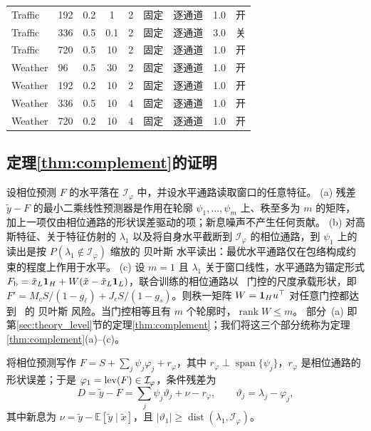 {\begin{table}[t]
\begin{tabular}{llccclccc}
Traffic & 192 & 0.2 & 1 & 2 & 固定 & 逐通道 & 1.0 & 开 \\
Traffic & 336 & 0.5 & 0.1 & 2 & 固定 & 逐通道 & 3.0 & 关 \\
Traffic & 720 & 0.5 & 10 & 2 & 固定 & 逐通道 & 1.0 & 开 \\
Weather & 96 & 0.5 & 30 & 2 & 固定 & 逐通道 & 1.0 & 开 \\
Weather & 192 & 0.2 & 10 & 2 & 固定 & 逐通道 & 1.0 & 开 \\
Weather & 336 & 0.5 & 10 & 4 & 固定 & 逐通道 & 1.0 & 开 \\
Weather & 720 & 0.2 & 10 & 4 & 固定 & 逐通道 & 1.0 & 开 \\
\bottomrule
\end{tabular}
\end{table}

\subsection{定理\ref{thm:complement}的证明}
\label{app:proof_complement}

 设相位预测 $F$ 的水平落在 $\mathcal I_\varphi$ 中，并设水平通路读取窗口的任意特征。
(a) 残差 $\tilde y-F$ 的最小二乘线性预测器是作用在轮廓 $\psi_1,\dots,\psi_m$ 上、秩至多为 $m$ 的矩阵，加上一项仅由相位通路的形状误差驱动的项；新息噪声不产生任何贡献。
(b) 对高斯特征、关于特征仿射的 $\lambda_1$ 以及将自身水平截断到 $\mathcal I_\varphi$ 的相位通路，到 $\psi_1$ 上的读出是按 $P(\lambda_1\notin\mathcal I_\varphi)$ 缩放的 贝叶斯 水平读出：最优水平通路仅在包络构成约束的程度上作用于水平。
(c) 设 $m=1$ 且 $\lambda_1$ 关于窗口线性，水平通路为锚定形式 $F_{\mathrm b}=\tilde x_L\mathbf 1_H+W(\tilde x-\tilde x_L\mathbf 1_L)$，联合训练的相位通路以~ 门控的尺度承载形状，即 $F'=M_cS/(1-g_\ell)+J_cS/(1-g_s)$。则秩一矩阵 $W=\mathbf 1_Hu^\top$ 对任意门控都达到~ 的 贝叶斯 风险。当门控相等且有 $m$ 个轮廓时，$\operatorname{rank}W\le m$。
部分~(a) 即第\ref{sec:theory_level}节的定理\ref{thm:complement}；我们将这三个部分统称为定理\ref{thm:complement}(a)--(c)。

将相位预测写作 $F=S+\sum_j\psi_j\varphi_j+r_\varphi$，其中 $r_\varphi\perp\operatorname{span}\{\psi_j\}$，$r_\varphi$ 是相位通路的形状误差；于是 $\varphi_1=\operatorname{lev}(F)\in\mathcal I_\varphi$，条件残差为
\begin{equation}
D=\tilde y-F=\textstyle\sum_j\psi_j\vartheta_j+\nu-r_\varphi,\qquad\vartheta_j=\lambda_j-\varphi_j,
\label{eq:dcond}
\end{equation}
其中新息为 $\nu=\tilde y-\mathbb E[\tilde y\mid\tilde x]$，且 $|\vartheta_1|\ge\operatorname{dist}(\lambda_1,\mathcal I_\varphi)$。

}
